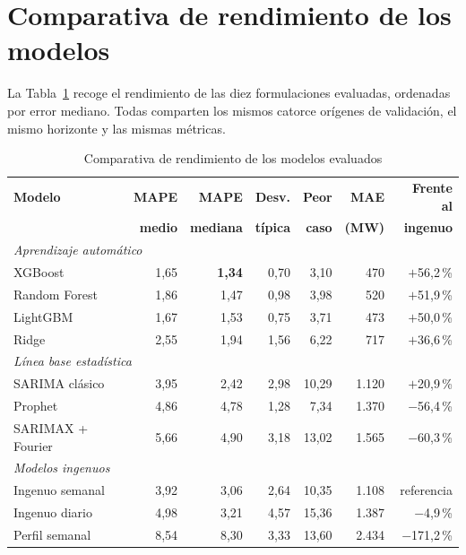 


\section{Comparativa de rendimiento de los modelos}

La Tabla~\ref{tab:resultados} recoge el rendimiento de las diez formulaciones
evaluadas, ordenadas por error mediano. Todas comparten los mismos catorce
orígenes de validación, el mismo horizonte y las mismas métricas.

\begin{table}[H]
\centering
\caption{Comparativa de rendimiento de los modelos evaluados}
\label{tab:resultados}
\small
\begin{tabular}{|l|r|r|r|r|r|r|}
\hline
\rowcolor{grisclaro}
\textbf{Modelo} & \textbf{MAPE} & \textbf{MAPE} & \textbf{Desv.} &
\textbf{Peor} & \textbf{MAE} & \textbf{Frente al} \\
\rowcolor{grisclaro}
 & \textbf{medio} & \textbf{mediana} & \textbf{típica} & \textbf{caso} &
\textbf{(MW)} & \textbf{ingenuo} \\
\hline
\multicolumn{7}{|l|}{\textit{Aprendizaje automático}} \\
\hline
XGBoost          & 1,65 & \textbf{1,34} & 0,70 & 3,10 & 470 & $+$56,2\,\% \\
\hline
Random Forest    & 1,86 & 1,47 & 0,98 & 3,98 & 520 & $+$51,9\,\% \\
\hline
LightGBM         & 1,67 & 1,53 & 0,75 & 3,71 & 473 & $+$50,0\,\% \\
\hline
Ridge            & 2,55 & 1,94 & 1,56 & 6,22 & 717 & $+$36,6\,\% \\
\hline
\multicolumn{7}{|l|}{\textit{Línea base estadística}} \\
\hline
SARIMA clásico   & 3,95 & 2,42 & 2,98 & 10,29 & 1.120 & $+$20,9\,\% \\
\hline
Prophet          & 4,86 & 4,78 & 1,28 & 7,34 & 1.370 & $-$56,4\,\% \\
\hline
SARIMAX + Fourier & 5,66 & 4,90 & 3,18 & 13,02 & 1.565 & $-$60,3\,\% \\
\hline
\multicolumn{7}{|l|}{\textit{Modelos ingenuos}} \\
\hline
Ingenuo semanal  & 3,92 & 3,06 & 2,64 & 10,35 & 1.108 & referencia \\
\hline
Ingenuo diario   & 4,98 & 3,21 & 4,57 & 15,36 & 1.387 & $-$4,9\,\% \\
\hline
Perfil semanal   & 8,54 & 8,30 & 3,33 & 13,60 & 2.434 & $-$171,2\,\% \\
\hline
\end{tabular}
\end{table}

